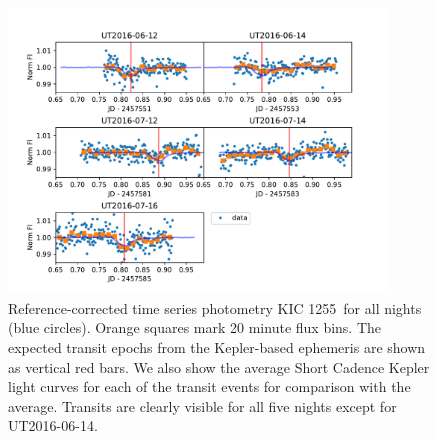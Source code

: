 \documentclass[twocolumn]{aastex61}
\newcommand{\shStar}{KIC 1255}
\begin{document}
\begin{figure}
\begin{centering}
\includegraphics[width=0.9\textwidth]{images/all_kic1255_phot/all_kic1255_refcor.pdf}
\caption{Reference-corrected time series photometry \shStar\ for all nights (blue circles).
Orange squares mark 20 minute flux bins.
The expected transit epochs from the Kepler-based ephemeris \citep{vanWerkhoven2014} are shown as vertical red bars.
We also show the average Short Cadence Kepler light curves for each of the transit events for comparison with the average.
Transits are clearly visible for all five nights except for UT2016-06-14.}\label{fig:allNightrefCorrect}
\end{centering}
\end{figure}


\clearpage
\end{document}
